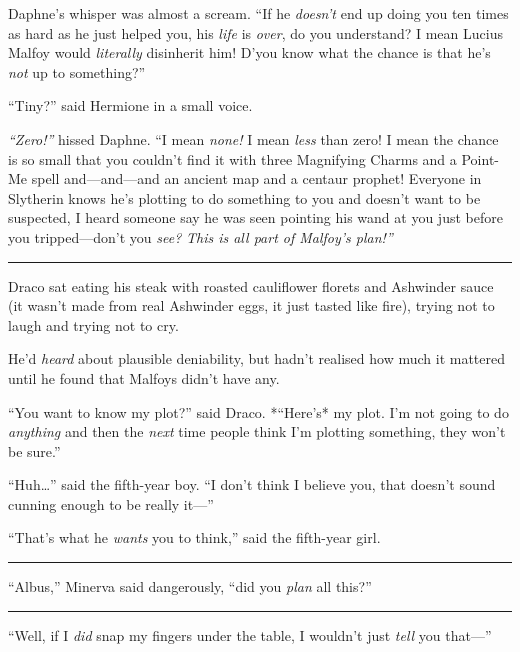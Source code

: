 Daphne's whisper was almost a scream. ``If he \emph{doesn't} end up
doing you ten times as hard as he just helped you, his \emph{life} is
\emph{over}, do you understand? I mean Lucius Malfoy would
\emph{literally} disinherit him! D'you know what the chance is that he's
\emph{not} up to something?''

``Tiny?'' said Hermione in a small voice.

\emph{``Zero!''} hissed Daphne. ``I mean \emph{none!} I mean \emph{less}
than zero! I mean the chance is so small that you couldn't find it with
three Magnifying Charms and a Point-Me spell and---and---and an ancient
map and a centaur prophet! Everyone in Slytherin knows he's plotting to
do something to you and doesn't want to be suspected, I heard someone
say he was seen pointing his wand at you just before you tripped---don't
you \emph{see?} \emph{This is all part of Malfoy's plan!''}

\begin{center}\rule{3in}{0.4pt}\end{center}

Draco sat eating his steak with roasted cauliflower florets and
Ashwinder sauce (it wasn't made from real Ashwinder eggs, it just tasted
like fire), trying not to laugh and trying not to cry.

He'd \emph{heard} about plausible deniability, but hadn't realised how
much it mattered until he found that Malfoys didn't have any.

``You want to know my plot?'' said Draco. *``Here's* my plot. I'm not
going to do \emph{anything} and then the \emph{next} time people think
I'm plotting something, they won't be sure.''

``Huh\ldots{}'' said the fifth-year boy. ``I don't think I believe you,
that doesn't sound cunning enough to be really it---''

``That's what he \emph{wants} you to think,'' said the fifth-year girl.

\begin{center}\rule{3in}{0.4pt}\end{center}

``Albus,'' Minerva said dangerously, ``did you \emph{plan} all this?''

\begin{center}\rule{3in}{0.4pt}\end{center}

``Well, if I \emph{did} snap my fingers under the table, I wouldn't just
\emph{tell} you that---''

